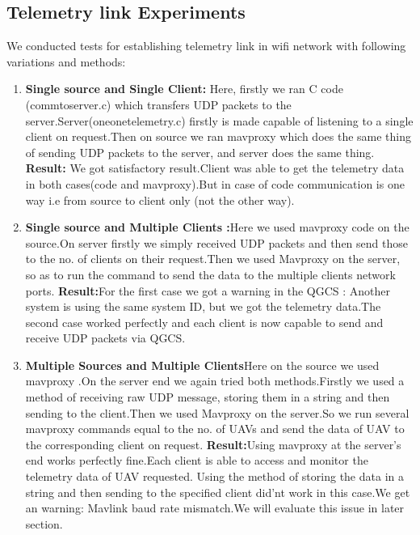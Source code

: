 \documentclass[12pt]{article}
\begin{document}
\subsection{Telemetry link Experiments}
We conducted tests for establishing telemetry link in wifi network with following variations and methods: \newline
\begin{enumerate}
\item {\bf Single source and Single Client:} Here, firstly we ran C code (commtoserver.c) which transfers UDP packets to the server.Server(oneonetelemetry.c) firstly is made capable of listening to a single client on request.Then on source we ran mavproxy which does the same thing of sending UDP packets to the server, and server does the same thing.
\newline\newline
{\bf Result:} We got satisfactory result.Client was able to get the telemetry data in both cases(code and mavproxy).But in case of code communication is one way i.e from source to client only (not the other way).\newline
\item {\bf Single source and Multiple Clients :}Here we used mavproxy code on the source.On server firstly we simply received UDP packets and then send those to the no. of clients on their request.Then we used Mavproxy on the server, so as to run the command to send the data to the multiple clients network ports.
\newline\newline
{\bf Result:}For the first case we got a warning in the QGCS : Another system is using the same system ID, but we got the telemetry data.The second case worked perfectly and each client is now capable to send and receive UDP packets via QGCS.
\item {\bf Multiple Sources and Multiple Clients}Here on the source we used mavproxy .On the server end we again tried both methods.Firstly we used a method of receiving raw UDP message, storing them in a string and then sending to the client.\newline Then we used Mavproxy on the server.So we run several mavproxy commands equal to the no. of UAVs and send the data of UAV to the corresponding client on request.\newline\newline
{\bf Result:}Using mavproxy at the server's end works perfectly fine.Each client is able to access and monitor the telemetry data of UAV requested.\newline
Using the method of storing the data in a string and then sending to the specified client did'nt work in this case.We get an warning: Mavlink baud rate mismatch.We will evaluate this issue in later section.
\end{enumerate}
\end{document}
